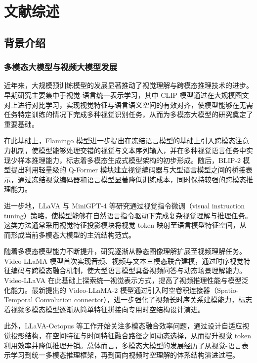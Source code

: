 \cleardoublepage
\newrefsection
\chapter{文献综述}

\section{背景介绍}

\subsection{多模态大模型与视频大模型发展}

近年来，大规模预训练模型的发展显著推动了视觉理解与跨模态推理技术的进步。早期研究主要集中于视觉-语言统一表示学习，其中 CLIP 模型通过在大规模图文对上进行对比学习，实现视觉特征与语言语义空间的有效对齐，使模型能够在无需任务特定训练的情况下完成多种视觉识别任务，从而为多模态大模型的研究奠定了重要基础\cite{clip2021}。

在此基础上，Flamingo 模型进一步提出在冻结语言模型的基础上引入跨模态注意力机制，使模型能够处理交错的视觉与文本序列输入，并在多种视觉语言任务中实现少样本推理能力，标志着多模态生成式模型架构的初步形成\cite{flamingo2022}。随后，BLIP-2 模型提出利用轻量级的 Q-Former 模块建立视觉编码器与大型语言模型之间的桥接表示，通过冻结视觉编码器和语言模型显著降低训练成本，同时保持较强的跨模态推理能力\cite{blip22023}。

进一步地，LLaVA 与 MiniGPT-4 等研究通过视觉指令微调（visual instruction tuning）策略，使模型能够在自然语言指令驱动下完成复杂视觉理解与推理任务。这类方法通常采用视觉特征投影模块将视觉 token 映射至语言模型特征空间，从而形成当前多模态大模型的主流结构范式\cite{llava2023,minigpt42023}。

随着多模态模型能力不断提升，研究逐渐从静态图像理解扩展至视频理解任务。Video-LLaMA 模型首次实现音频、视频与文本三模态联合建模，通过时序视觉特征编码与跨模态融合机制，使大型语言模型具备视频问答与动态场景理解能力\cite{videollama2023}。Video-LLaVA 在此基础上探索统一视觉表示方式，提高了视频推理性能与模型泛化能力\cite{videollava2023}。最新提出的 Video-LLaMA-2 模型通过引入时空卷积连接器（Spatio-Temporal Convolution connector），进一步强化了视频长时序关系建模能力，标志着视频多模态模型逐渐从简单特征拼接向专用时空结构设计演进\cite{videollama22024}。

此外，LLaVA-Octopus 等工作开始关注多模态融合效率问题，通过设计自适应视觉投影结构，在空间特征与时间特征融合路径之间动态选择，从而提升视觉 token 利用效率并降低推理开销\cite{llavaoctopus2025}。总体而言，多模态大模型的发展经历了从视觉-语言表示学习到统一多模态推理框架，再到面向视频时空理解的体系结构演进过程。

